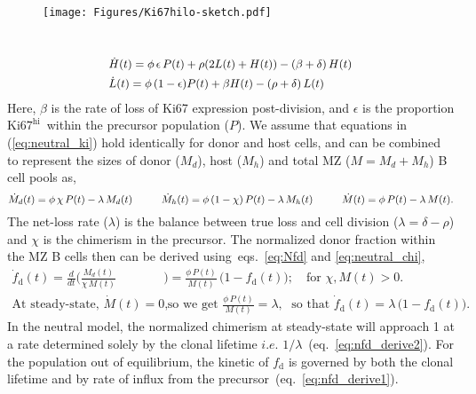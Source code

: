 \documentclass[11pt]{article}
\newcommand{\khi}{\ensuremath{\text{Ki67}^\text{hi}}~}
\newcommand\ie{$\textit{i.e.}$}
\begin{document}
\vspace{-4mm}
\begin{wrapfigure}[7]{l}{0.34\textwidth}
\centering
\texttt{[image: Figures/Ki67hilo-sketch.pdf]}%
\label{fig:ki67_sketch}
\end{wrapfigure}
~
\begin{eqnarray}
\small
\begin{aligned} 
& \dot H(t) = \phi \, \epsilon \, P(t) + \rho (2 L(t) + H(t)) - (\beta + \delta) \, H(t) \\
& \dot L(t) = \phi \, (1-\epsilon) P(t) + \beta H(t) - (\rho + \delta) \, L(t) 
\label{eq:neutral_ki}
\end{aligned}
\end{eqnarray}
Here, $\beta$ is the rate of loss of Ki67 expression post-division, and $\epsilon$ is the proportion \khi within the precursor population ($P$).
We assume that equations in (\ref{eq:neutral_ki}) hold identically for donor and host cells, and can be combined to represent the sizes of donor ($M_{d}$), host ($M_{h}$) and total MZ ($M = M_{d} + M_{h}$) B cell pools as,
{\small
\begin{equation}\small
\dot M_{d}(t) = \phi \, \chi \, P(t) - \lambda \, M_{d}(t) \quad \quad \quad
\dot M_{h}(t) = \phi \, (1-\chi) \, P(t) - \lambda \, M_{h}(t) \quad \quad \quad
\dot M(t) = \phi \, P(t) - \lambda \, M(t).
\label{eq:neutral_chi}
\end{equation}
}%
The net-loss rate ($\lambda$) is the balance between true loss and cell division ($\lambda = \delta - \rho$) and $\chi$ is the chimerism in the precursor.
The normalized donor fraction within the MZ B cells then can be derived using~eqs.~\ref{eq:Nfd} and \ref{eq:neutral_chi},
{\small
\begin{align} 
\dot f_\text{d}(t) = \frac{d}{dt} \bigg(\frac{M_{d}(t)}{\chi \, M(t)} & \bigg)  = \frac{\phi \, P(t)}{M(t)} \, \big(1-f_\text{d}(t)\big); \quad \text{for }\chi, M(t) > 0. \label{eq:nfd_derive1} \\  
\text{At steady-state, } \dot M(t) = 0, \; & \text{ so we get }  \frac{\phi \, P(t)}{M(t)} = \lambda,  \; \text{ so that }  \dot f_\text{d}(t) = \lambda \, \big(1 - f_\text{d}(t)\big). 
\label{eq:nfd_derive2}
\end{align}
}%
In the neutral model, the normalized chimerism at steady-state will approach 1 at a rate determined solely by the clonal lifetime {\ie} $1/\lambda$~(eq.~\ref{eq:nfd_derive2}). 
For the population out of equilibrium, the kinetic of $f_\text{d}$ is governed by both the clonal lifetime and by rate of influx from the precursor~(eq.~\ref{eq:nfd_derive1}).
\end{document}
